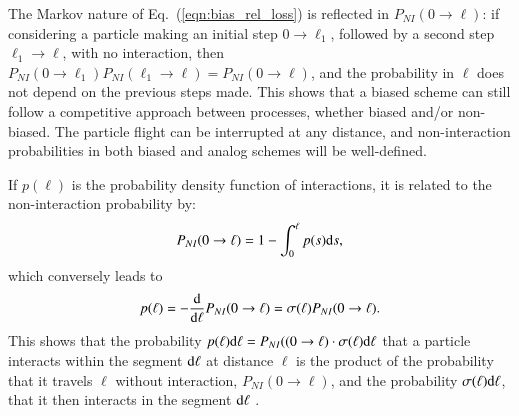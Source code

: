 The Markov nature of Eq.~(\ref{eqn:bias_rel_loss}) is reflected in 
$P_{NI}(0\to\ell)$: if considering a particle making an initial step $0\to\ell_1$,
followed by a second step $\ell_1\to\ell$, with no interaction,
%
then
$P_{NI}(0\to\ell_1)P_{NI}(\ell_1\to\ell) = P_{NI}(0\to\ell)$,
%
%
and the probability in $\ell$ does not depend on the previous steps made. This
shows that a biased scheme can still follow a competitive approach between
processes, whether biased and/or non-biased.  The particle flight can be
interrupted at any distance, and non-interaction probabilities in both biased
and analog schemes will be well-defined.

If $p(\ell)$ is the probability density function of interactions, it is related 
to the non-interaction probability by:
\begin{equation}
\label{eqn_PNI_p}
P_{NI}(0\to\ell) = 1 - \int_0^\ell {p(s){{\rm d}s}} ,
\end{equation}
which conversely leads to
\begin{equation}
\label{eqn:p_to_PNI}
p(\ell) = -\frac{{\rm d}}{{\rm d}\ell}P_{NI}(0\to\ell) = \sigma(\ell) P_{NI}(0\to\ell) .
\end{equation}
This shows that the probability 
$p(\ell){\rm d}\ell = P_{NI}((0\to\ell)\cdot \sigma(\ell){\rm d}\ell$
that a particle interacts within the segment ${\rm d}\ell$ at distance $\ell$ is
the product of the probability that it travels $\ell$ without interaction, 
$P_{NI}(0\to\ell)$, and the probability $\sigma(\ell){\rm d}\ell$, that it 
then interacts in the segment ${\rm d}\ell$ \cite{bib:MCNP}.

